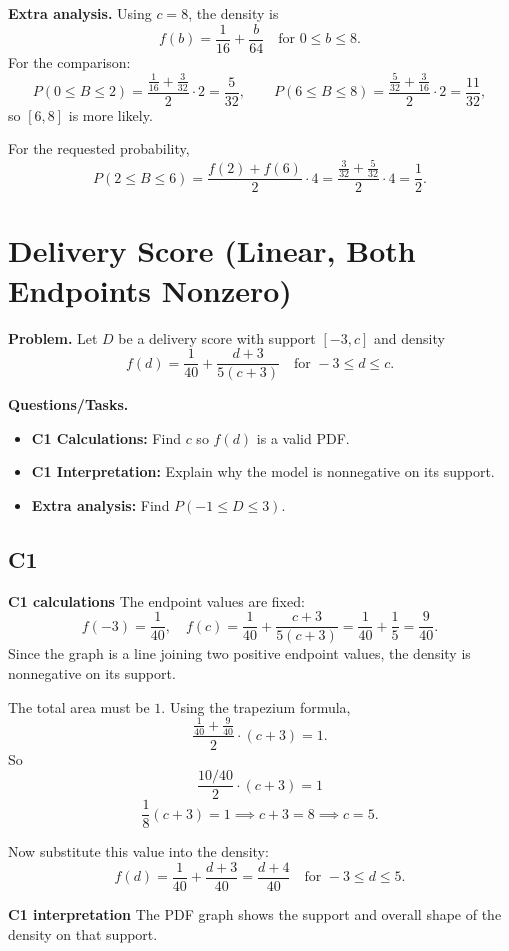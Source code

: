\textbf{Extra analysis.}
Using $c=8$, the density is
\[
f(b)=\frac{1}{16}+\frac{b}{64}\quad\text{for }0\le b\le 8.
\]
For the comparison:
\[
P(0\le B\le2)=\frac{\frac{1}{16}+\frac{3}{32}}{2}\cdot2=\frac{5}{32},\qquad
P(6\le B\le8)=\frac{\frac{5}{32}+\frac{3}{16}}{2}\cdot2=\frac{11}{32},
\]
so $[6,8]$ is more likely.

For the requested probability,
\[
P(2\le B\le6)=\frac{f(2)+f(6)}{2}\cdot4
=\frac{\frac{3}{32}+\frac{5}{32}}{2}\cdot4
=\frac12.
\]


	\section{Delivery Score (Linear, Both Endpoints Nonzero)}
	
	\textbf{Problem.}
	Let $D$ be a delivery score with support $[-3,c]$ and density
	\[
	f(d)=\frac{1}{40}+\frac{d+3}{5(c+3)}\quad\text{for }-3\le d\le c.
	\]
	
	\textbf{Questions/Tasks.}
	\begin{itemize}
		\item \textbf{C1 Calculations:} Find $c$ so $f(d)$ is a valid PDF.
		\item \textbf{C1 Interpretation:} Explain why the model is nonnegative on its support.
		\item \textbf{Extra analysis:} Find $P(-1\le D\le 3)$.
	\end{itemize}
	
	\subsection*{C1}
	
	\textbf{C1 calculations}
	The endpoint values are fixed:
	\[
	f(-3)=\frac{1}{40},\quad f(c)=\frac{1}{40}+\frac{c+3}{5(c+3)}=\frac{1}{40}+\frac15=\frac{9}{40}.
	\]
	Since the graph is a line joining two positive endpoint values, the density is nonnegative on its support.
	
	The total area must be $1$. Using the trapezium formula,
	\[
	\frac{\frac{1}{40}+\frac{9}{40}}{2}\cdot(c+3)=1.
	\]
	So
	\[
	\frac{10/40}{2}\cdot(c+3)=1
	\]
	\[
	\frac{1}{8}(c+3)=1\implies c+3=8\implies c=5.
	\]
	
	Now substitute this value into the density:
	\[
	f(d)=\frac{1}{40}+\frac{d+3}{40}=\frac{d+4}{40}\quad\text{for }-3\le d\le 5.
	\]
	
	\textbf{C1 interpretation}
	The PDF graph shows the support and overall shape of the density on that support.
	

